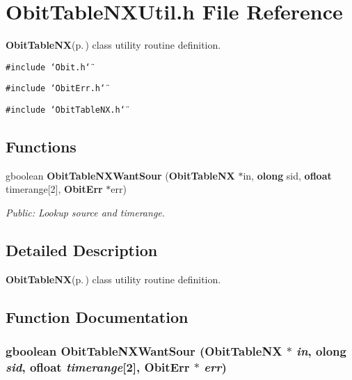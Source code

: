 \section{Obit\-Table\-NXUtil.h File Reference}
\label{ObitTableNXUtil_8h}
{\bf Obit\-Table\-NX}{\rm (p.\,\pageref{structObitTableNX})} class utility routine definition. 

{\tt \#include \char`\"{}Obit.h\char`\"{}}\par
{\tt \#include \char`\"{}Obit\-Err.h\char`\"{}}\par
{\tt \#include \char`\"{}Obit\-Table\-NX.h\char`\"{}}\par
\subsection*{Functions}
\begin{CompactItemize}
\item 
gboolean {\bf Obit\-Table\-NXWant\-Sour} ({\bf Obit\-Table\-NX} $\ast$in, {\bf olong} sid, {\bf ofloat} timerange[2], {\bf Obit\-Err} $\ast$err)
\begin{CompactList}\small\item\em Public: Lookup source and timerange. \item\end{CompactList}\end{CompactItemize}


\subsection{Detailed Description}
{\bf Obit\-Table\-NX}{\rm (p.\,\pageref{structObitTableNX})} class utility routine definition. 



\subsection{Function Documentation}
\subsubsection{\setlength{\rightskip}{0pt plus 5cm}gboolean Obit\-Table\-NXWant\-Sour ({\bf Obit\-Table\-NX} $\ast$ {\em in}, {\bf olong} {\em sid}, {\bf ofloat} {\em timerange}[2], {\bf Obit\-Err} $\ast$ {\em err})}\label{ObitTableNXUtil_8h_a0}


